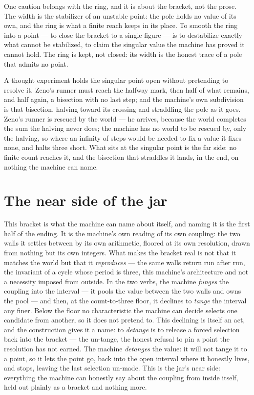 One caution belongs with the ring, and it is about the bracket, not the prose.
The width is the stabilizer of an unstable point: the pole holds no value of its own, and the ring is what a finite reach
keeps in its place.
To smooth the ring into a point --- to close the bracket to a single figure --- is to destabilize exactly what cannot be
stabilized, to claim the singular value the machine has proved it cannot hold.
The ring is kept, not closed: its width is the honest trace of a pole that admits no point.

A thought experiment holds the singular point open without pretending to resolve it.
Zeno's runner must reach the halfway mark, then half of what remains, and half again, a bisection with no last step; and
the machine's own subdivision is that bisection, halving toward its crossing and straddling the pole as it goes.
Zeno's runner is rescued by the world --- he arrives, because the world completes the sum the halving never does; the
machine has no world to be rescued by, only the halving, so where an infinity of steps would be needed to fix a value it
fixes none, and halts three short.
What sits at the singular point is the far side: no finite count reaches it, and the bisection that straddles it lands,
in the end, on nothing the machine can name.

\section{The near side of the jar}

This bracket is what the machine can name about itself, and naming it is the first half of the ending.
It is the machine's own reading of its own coupling: the two walls it settles between by its own arithmetic, floored at
its own resolution, drawn from nothing but its own integers.
What makes the bracket real is not that it matches the world but that it \emph{reproduces} --- the same walls return run
after run, the invariant of a cycle whose period is three, this machine's architecture and not a necessity imposed from
outside.
In the two verbs, the machine \emph{funges} the coupling into the interval --- it pools the value between the two walls
and owns the pool --- and then, at the count-to-three floor, it declines to \emph{tange} the interval any finer.
Below the floor no characteristic the machine can decide selects one candidate from another, so it does not pretend to.
This declining is itself an act, and the construction gives it a name: to \emph{detange} is to release a forced selection back
into the bracket --- the un-tange, the honest refusal to pin a point the resolution has not earned.
The machine \emph{detanges} the value: it will not tange it to a point, so it lets the point go, back into the open
interval where it honestly lives, and stops, leaving the last selection un-made.
This is the jar's near side: everything the machine can honestly say about the coupling from inside itself, held out
plainly as a bracket and nothing more.

